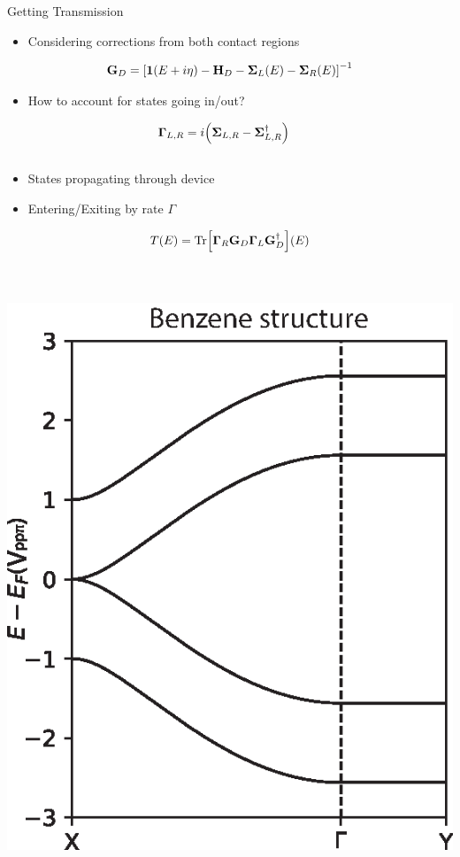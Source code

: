 \documentclass[hyperref={colorlinks=true,urlcolor=blue,linkcolor=.},aspectratio=1610,mathserif]{beamer}
\newcommand{\im}[3]{\inputminted[linenos=true, python3=true, firstline=#2, lastline=#3]{python}{#1}}
\begin{document}
\begin{frame}{Getting Transmission}
	\centering
	\begin{overprint}
		\begin{itemize}
		    \item Considering corrections from both contact regions
		\end{itemize}
		\begin{align*}
			\vb{G}_D  = \bqty{\vb{1}\pqty{E+i\eta}-\vb{H}_D - \vb{\Sigma}_L(E)-\vb{\Sigma}_R(E)}^{-1}
		\end{align*}
		\begin{itemize}
		    \item How to account for states going in/out? 
		\end{itemize}
		\begin{align*}
		    \vb{\Gamma}_{L,R} & = i\pqty{\vb{\Sigma}_{L,R} - \vb{\Sigma}_{L,R}^{\dagger}}
		\end{align*}
		\im{Listings/Functions.py}{225}{228}
		\begin{itemize}
		    \item States propagating through device 
		    \item Entering/Exiting by rate \(\Gamma\)
		\end{itemize}
		\begin{align*}
			T(E) = \mathrm{Tr}\bqty{\vb{\Gamma}_R\vb{G}_D\vb{\Gamma}_L\vb{G}_D^{\dagger}}(E)
		\end{align*}
		\begin{columns}[c]
			\im{Listings/Functions.py}{240}{243}
		\end{columns}
		\vspace{-.5cm}
		\begin{columns}[c]
			\includegraphics[width=.75\textwidth]{Figures/Beta1.eps}

\end{columns}
\end{overprint}
\end{frame}
\end{document}
